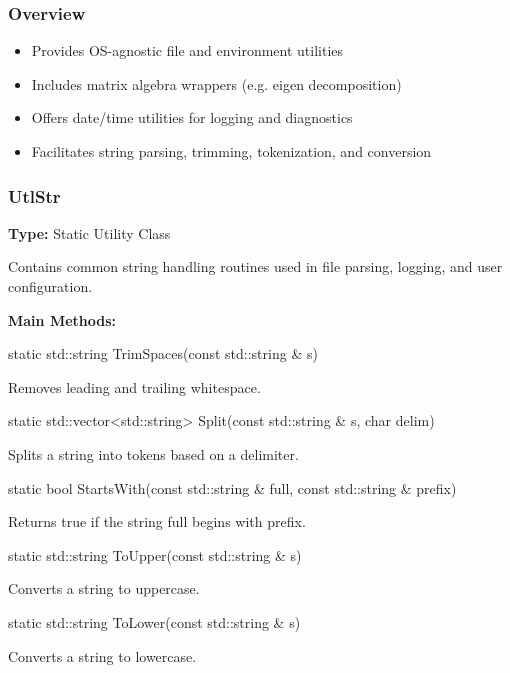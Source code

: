 \vspace{1em}
\subsubsection*{Overview}

\begin{itemize}
  \item Provides OS-agnostic file and environment utilities
  \item Includes matrix algebra wrappers (e.g. eigen decomposition)
  \item Offers date/time utilities for logging and diagnostics
  \item Facilitates string parsing, trimming, tokenization, and conversion
\end{itemize}

\vspace{1em}
\subsubsection*{\color{cadmiumgreen}\bf UtlStr}

\textbf{Type:} Static Utility Class

Contains common string handling routines used in file parsing, logging, and user configuration.

\vspace{0.5em}
\noindent\textbf{Main Methods:}

\begin{description}[align=left]

  \item[] {\color{cadmiumred} static std::string TrimSpaces(const std::string \& s)}

  Removes leading and trailing whitespace.

  \item[] {\color{cadmiumred} static std::vector<std::string> Split(const std::string \& s, char delim)}

  Splits a string into tokens based on a delimiter.

  \item[] {\color{cadmiumred} static bool StartsWith(const std::string \& full, const std::string \& prefix)}

  Returns {\color{amber}true} if the string {\color{amber}full} begins with {\color{amber}prefix}.

  \item[] {\color{cadmiumred} static std::string ToUpper(const std::string \& s)}

  Converts a string to uppercase.

  \item[] {\color{cadmiumred} static std::string ToLower(const std::string \& s)}

  Converts a string to lowercase.

\end{description}

